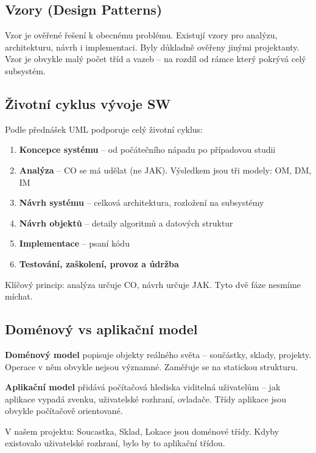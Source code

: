 \documentclass[12pt, a4paper]{article}
\begin{document}
\subsection{Vzory (Design Patterns)}

Vzor je ověřené řešení k obecnému problému. Existují vzory pro analýzu, architekturu, návrh i implementaci. Byly důkladně ověřeny jinými projektanty. Vzor je obvykle malý počet tříd a vazeb -- na rozdíl od rámce který pokrývá celý subsystém.

\subsection{Životní cyklus vývoje SW}

Podle přednášek UML podporuje celý životní cyklus:
\begin{enumerate}
  \item \textbf{Koncepce systému} -- od počátečního nápadu po případovou studii
  \item \textbf{Analýza} -- CO se má udělat (ne JAK). Výsledkem jsou tři modely: OM, DM, IM
  \item \textbf{Návrh systému} -- celková architektura, rozložení na subsystémy
  \item \textbf{Návrh objektů} -- detaily algoritmů a datových struktur
  \item \textbf{Implementace} -- psaní kódu
  \item \textbf{Testování, zaškolení, provoz a údržba}
\end{enumerate}

Klíčový princip: analýza určuje CO, návrh určuje JAK. Tyto dvě fáze nesmíme míchat.

\subsection{Doménový vs aplikační model}

\textbf{Doménový model} popisuje objekty reálného světa -- součástky, sklady, projekty. Operace v něm obvykle nejsou významné. Zaměřuje se na statickou strukturu.

\textbf{Aplikační model} přidává počítačová hlediska viditelná uživatelům -- jak aplikace vypadá zvenku, uživatelské rozhraní, ovladače. Třídy aplikace jsou obvykle počítačově orientované.

V našem projektu: Soucastka, Sklad, Lokace jsou doménové třídy. Kdyby existovalo uživatelské rozhraní, bylo by to aplikační třídou.
\end{document}

